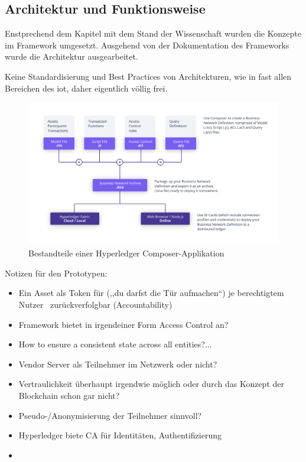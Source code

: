 \subsection{Architektur und Funktionsweise}
\label{sec:prototype_arch}
    Enstprechend dem Kapitel mit dem Stand der Wissenschaft wurden die Konzepte im Framework umgesetzt.
    Ausgehend von der Dokumentation des Frameworks \cite{ComposerDocs} wurde die Architektur ausgearbeitet. 
    
    Keine Standardisierung und Best Practices von Architekturen, wie in fast allen Bereichen des \gls{iot}, daher eigentlich völlig frei.
    
    \begin{figure}[H]
		\centering
		\includegraphics[width=\textwidth]{graphics/Composer-Diagram.png}
		\caption[Bestandteile einer Hyperledger Composer-Applikation]{Bestandteile einer Hyperledger Composer-Applikation\cite{ComposerDocs}}
		\label{fig:composer_arch}
	\end{figure}
    
    Notizen für den Prototypen:
    \begin{itemize}[noitemsep]
        \item Ein Asset als Token für (,,du darfst die Tür aufmachen``) je berechtigtem Nutzer \textrightarrow\ zurückverfolgbar (Accountability)
        \item Framework bietet in irgendeiner Form Access Control an?
        \item How to ensure a consistent state across all entities?...
        \item Vendor Server als Teilnehmer im Netzwerk oder nicht?
        \item Vertraulichkeit überhaupt irgendwie möglich oder durch das Konzept der Blockchain schon gar nicht?
        \item Pseudo-/Anonymisierung der Teilnehmer sinnvoll?
        \item Hyperledger biete CA für Identitäten, Authentifizierung
        \item 
    \end{itemize}
    
